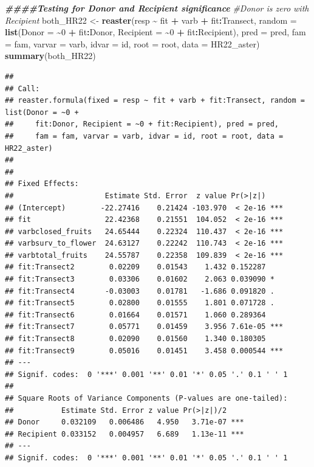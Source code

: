 \documentclass[
]{article}
\newenvironment{Shaded}{\begin{snugshade}}{\end{snugshade}}
\newcommand{\AttributeTok}[1]{\textcolor[rgb]{0.13,0.29,0.53}{#1}}
\newcommand{\CommentTok}[1]{\textcolor[rgb]{0.56,0.35,0.01}{\textit{#1}}}
\newcommand{\DecValTok}[1]{\textcolor[rgb]{0.00,0.00,0.81}{#1}}
\newcommand{\DocumentationTok}[1]{\textcolor[rgb]{0.56,0.35,0.01}{\textbf{\textit{#1}}}}
\newcommand{\FunctionTok}[1]{\textcolor[rgb]{0.13,0.29,0.53}{\textbf{#1}}}
\newcommand{\NormalTok}[1]{#1}
\newcommand{\OtherTok}[1]{\textcolor[rgb]{0.56,0.35,0.01}{#1}}
\newcommand{\SpecialCharTok}[1]{\textcolor[rgb]{0.81,0.36,0.00}{\textbf{#1}}}
\begin{document}
\begin{Shaded}
\begin{Highlighting}[]
\DocumentationTok{\#\#\#\#Testing for Donor and Recipient significance}
\CommentTok{\#Donor is zero with Recipient}
\NormalTok{both\_HR22 }\OtherTok{\textless{}{-}} \FunctionTok{reaster}\NormalTok{(resp }\SpecialCharTok{\textasciitilde{}}\NormalTok{ fit }\SpecialCharTok{+}\NormalTok{ varb }\SpecialCharTok{+}\NormalTok{ fit}\SpecialCharTok{:}\NormalTok{Transect, }\AttributeTok{random =} \FunctionTok{list}\NormalTok{(}\AttributeTok{Donor =} \SpecialCharTok{\textasciitilde{}}\DecValTok{0} \SpecialCharTok{+} 
\NormalTok{    fit}\SpecialCharTok{:}\NormalTok{Donor, }\AttributeTok{Recipient =} \SpecialCharTok{\textasciitilde{}}\DecValTok{0} \SpecialCharTok{+}\NormalTok{ fit}\SpecialCharTok{:}\NormalTok{Recipient), }\AttributeTok{pred =}\NormalTok{ pred, }\AttributeTok{fam =}\NormalTok{ fam, }\AttributeTok{varvar =}\NormalTok{ varb, }
    \AttributeTok{idvar =}\NormalTok{ id, }\AttributeTok{root =}\NormalTok{ root, }\AttributeTok{data =}\NormalTok{ HR22\_aster)}
\FunctionTok{summary}\NormalTok{(both\_HR22)}
\end{Highlighting}
\end{Shaded}

\begin{verbatim}
## 
## Call:
## reaster.formula(fixed = resp ~ fit + varb + fit:Transect, random = list(Donor = ~0 + 
##     fit:Donor, Recipient = ~0 + fit:Recipient), pred = pred, 
##     fam = fam, varvar = varb, idvar = id, root = root, data = HR22_aster)
## 
## 
## Fixed Effects:
##                     Estimate Std. Error  z value Pr(>|z|)    
## (Intercept)        -22.27416    0.21424 -103.970  < 2e-16 ***
## fit                 22.42368    0.21551  104.052  < 2e-16 ***
## varbclosed_fruits   24.65444    0.22324  110.437  < 2e-16 ***
## varbsurv_to_flower  24.63127    0.22242  110.743  < 2e-16 ***
## varbtotal_fruits    24.55787    0.22358  109.839  < 2e-16 ***
## fit:Transect2        0.02209    0.01543    1.432 0.152287    
## fit:Transect3        0.03306    0.01602    2.063 0.039090 *  
## fit:Transect4       -0.03003    0.01781   -1.686 0.091820 .  
## fit:Transect5        0.02800    0.01555    1.801 0.071728 .  
## fit:Transect6        0.01664    0.01571    1.060 0.289364    
## fit:Transect7        0.05771    0.01459    3.956 7.61e-05 ***
## fit:Transect8        0.02090    0.01560    1.340 0.180305    
## fit:Transect9        0.05016    0.01451    3.458 0.000544 ***
## ---
## Signif. codes:  0 '***' 0.001 '**' 0.01 '*' 0.05 '.' 0.1 ' ' 1
## 
## Square Roots of Variance Components (P-values are one-tailed):
##           Estimate Std. Error z value Pr(>|z|)/2    
## Donor     0.032109   0.006486   4.950   3.71e-07 ***
## Recipient 0.033152   0.004957   6.689   1.13e-11 ***
## ---
## Signif. codes:  0 '***' 0.001 '**' 0.01 '*' 0.05 '.' 0.1 ' ' 1
\end{verbatim}
\end{document}

